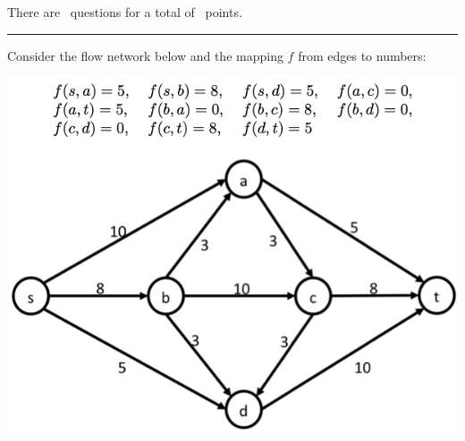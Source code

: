 \documentclass[answers]{exam}
\newenvironment{answer}{%
     \renewcommand{\solutiontitle}{\noindent\textbf{Answer:}\enspace}
     \begin{solution}
     }{%
     \end{solution}
     \renewcommand{\solutiontitle}{\noindent\textbf{Solution:}\enspace}
 }
\begin{document}
\vspace{0.1in}


\vspace{0.1in}
There are \numquestions\, questions for a total of \numpoints\, points.
\vspace{0.1in}
\hrule
 \vspace{0.2in}
\begin{questions}
 
\question[3] 

Consider the flow network below and the mapping $f$ from edges to numbers:

    \begin{center}
        \includegraphics[scale=0.9]{img/flow1.png}
    \end{center}

\end{questions}
\end{document}
